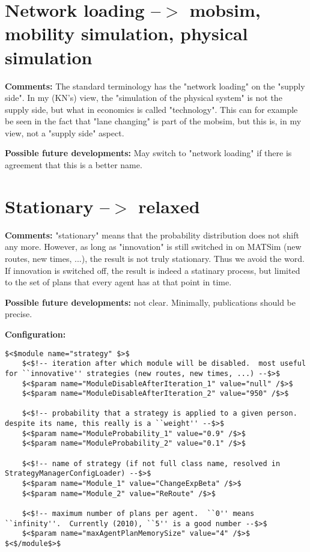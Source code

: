 \vfill\eject
\section{Network loading --$>$ mobsim, mobility simulation, physical simulation}


\textbf{Comments:} The standard terminology has the "network   loading" on the "supply  side". In my (KN's) view, the  "simulation of  the physical system" is  not the supply side, but what  in economics is  called "technology". This  can for example be  seen in the fact that  "lane changing" is part of the  mobsim, but this  is, in my view, not a  "supply side" aspect.

\textbf{Possible future developments:} May switch to "network loading" if there is agreement that this is a better name.

\vfill\eject
\section{Stationary --$>$ relaxed}

\textbf{Comments:} "stationary" means that the probability   distribution does not shift any  more. However, as long as  "innovation"  is still switched in on MATSim  (new routes, new times,  ...), the  result is not truly stationary. Thus  we avoid the  word. If innovation  is switched off, the result is indeed a   statinary process, but limited  to the set of plans that every agent has   at that point in time.

\textbf{Possible future developments:} not clear. Minimally, publications should be precise.

\textbf{Configuration:}
\begin{verbatim}
$<$module name="strategy" $>$
	$<$!-- iteration after which module will be disabled.  most useful for ``innovative'' strategies (new routes, new times, ...) --$>$
	$<$param name="ModuleDisableAfterIteration_1" value="null" /$>$
	$<$param name="ModuleDisableAfterIteration_2" value="950" /$>$

	$<$!-- probability that a strategy is applied to a given person.  despite its name, this really is a ``weight'' --$>$
	$<$param name="ModuleProbability_1" value="0.9" /$>$
	$<$param name="ModuleProbability_2" value="0.1" /$>$

	$<$!-- name of strategy (if not full class name, resolved in StrategyManagerConfigLoader) --$>$
	$<$param name="Module_1" value="ChangeExpBeta" /$>$
	$<$param name="Module_2" value="ReRoute" /$>$

	$<$!-- maximum number of plans per agent.  ``0'' means ``infinity''.  Currently (2010), ``5'' is a good number --$>$
	$<$param name="maxAgentPlanMemorySize" value="4" /$>$
$<$/module$>$
\end{verbatim}

